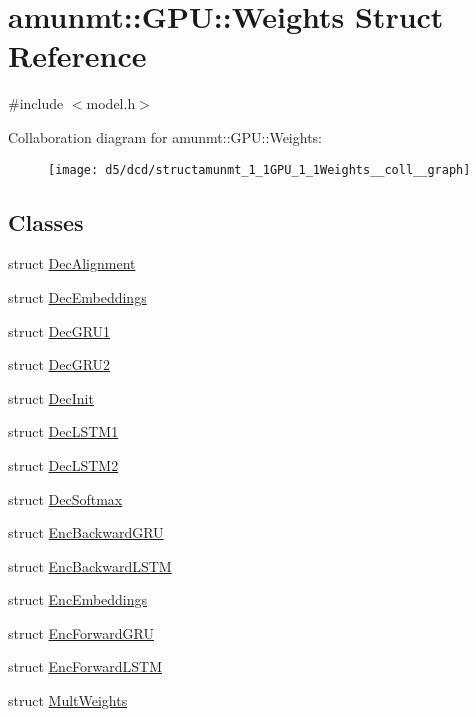 \hypertarget{structamunmt_1_1GPU_1_1Weights}{}\section{amunmt\+:\+:G\+PU\+:\+:Weights Struct Reference}
\label{structamunmt_1_1GPU_1_1Weights}


{\ttfamily \#include $<$model.\+h$>$}



Collaboration diagram for amunmt\+:\+:G\+PU\+:\+:Weights\+:
\nopagebreak
\begin{figure}[H]
\begin{center}
\leavevmode
\texttt{[image: d5/dcd/structamunmt\_1\_1GPU\_1\_1Weights\_\_coll\_\_graph]}
\end{center}
\end{figure}
\subsection*{Classes}
\begin{DoxyCompactItemize}
\item 
struct \hyperlink{structamunmt_1_1GPU_1_1Weights_1_1DecAlignment}{Dec\+Alignment}
\item 
struct \hyperlink{structamunmt_1_1GPU_1_1Weights_1_1DecEmbeddings}{Dec\+Embeddings}
\item 
struct \hyperlink{structamunmt_1_1GPU_1_1Weights_1_1DecGRU1}{Dec\+G\+R\+U1}
\item 
struct \hyperlink{structamunmt_1_1GPU_1_1Weights_1_1DecGRU2}{Dec\+G\+R\+U2}
\item 
struct \hyperlink{structamunmt_1_1GPU_1_1Weights_1_1DecInit}{Dec\+Init}
\item 
struct \hyperlink{structamunmt_1_1GPU_1_1Weights_1_1DecLSTM1}{Dec\+L\+S\+T\+M1}
\item 
struct \hyperlink{structamunmt_1_1GPU_1_1Weights_1_1DecLSTM2}{Dec\+L\+S\+T\+M2}
\item 
struct \hyperlink{structamunmt_1_1GPU_1_1Weights_1_1DecSoftmax}{Dec\+Softmax}
\item 
struct \hyperlink{structamunmt_1_1GPU_1_1Weights_1_1EncBackwardGRU}{Enc\+Backward\+G\+RU}
\item 
struct \hyperlink{structamunmt_1_1GPU_1_1Weights_1_1EncBackwardLSTM}{Enc\+Backward\+L\+S\+TM}
\item 
struct \hyperlink{structamunmt_1_1GPU_1_1Weights_1_1EncEmbeddings}{Enc\+Embeddings}
\item 
struct \hyperlink{structamunmt_1_1GPU_1_1Weights_1_1EncForwardGRU}{Enc\+Forward\+G\+RU}
\item 
struct \hyperlink{structamunmt_1_1GPU_1_1Weights_1_1EncForwardLSTM}{Enc\+Forward\+L\+S\+TM}
\item 
struct \hyperlink{structamunmt_1_1GPU_1_1Weights_1_1MultWeights}{Mult\+Weights}
\end{DoxyCompactItemize}
